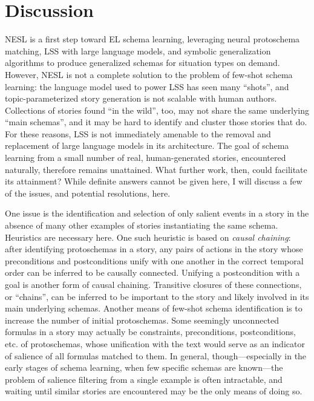 \section{Discussion}
\label{sec:nesl_discussion}

NESL is a first step toward EL schema learning, leveraging neural protoschema matching, LSS with large language models, and symbolic generalization algorithms to produce generalized schemas for situation types on demand. However, NESL is not a complete solution to the problem of few-shot schema learning: the language model used to power LSS has seen many ``shots'', and topic-parameterized story generation is not scalable with human authors. Collections of stories found ``in the wild'', too, may not share the same underlying ``main schemas'', and it may be hard to identify and cluster those stories that do. For these reasons, LSS is not immediately amenable to the removal and replacement of large language models in its architecture. The goal of schema learning from a small number of real, human-generated stories, encountered naturally, therefore remains unattained. What further work, then, could facilitate its attainment? While definite answers cannot be given here, I will discuss a few of the issues, and potential resolutions, here.


One issue is the identification and selection of only salient events in a story in the absence of many other examples of stories instantiating the same schema. Heuristics are necessary here. One such heuristic is based on \textit{causal chaining}: after identifying protoschemas in a story, any pairs of actions in the story whose preconditions and postconditions unify with one another in the correct temporal order can be inferred to be causally connected. Unifying a postcondition with a goal is another form of causal chaining. Transitive closures of these connections, or ``chains'', can be inferred to be important to the story and likely involved in its main underlying schemas. Another means of few-shot schema identification is to increase the number of initial protoschemas. Some seemingly unconnected formulas in a story may actually be constraints, preconditions, postconditions, etc. of protoschemas, whose unification with the text would serve as an indicator of salience of all formulas matched to them. In general, though---especially in the early stages of schema learning, when few specific schemas are known---the problem of salience filtering from a single example is often intractable, and waiting until similar stories are encountered may be the only means of doing so.

